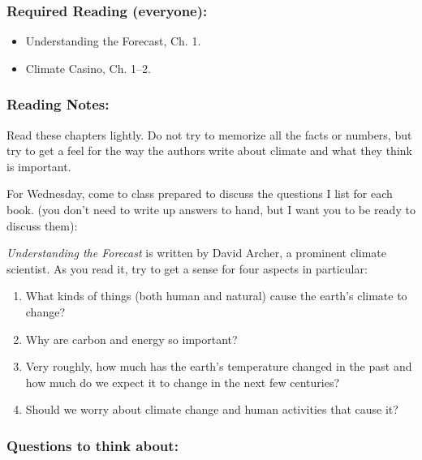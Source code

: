 \documentclass[
]{article}
\providecommand{\tightlist}{%
  \setlength{\itemsep}{0pt}\setlength{\parskip}{0pt}}
\begin{document}
\hypertarget{required-reading-everyone}{%
\subsubsection{Required Reading
(everyone):}\label{required-reading-everyone}}

\begin{itemize}
\tightlist
\item
  Understanding the Forecast, Ch. 1.
\item
  Climate Casino, Ch. 1--2.
\end{itemize}

\hypertarget{reading-notes}{%
\subsubsection{Reading Notes:}\label{reading-notes}}

Read these chapters lightly. Do not try to memorize all the facts or
numbers, but try to get a feel for the way the authors write about
climate and what they think is important.

For Wednesday, come to class prepared to discuss the questions I list
for each book. (you don't need to write up answers to hand, but I want
you to be ready to discuss them):

\emph{Understanding the Forecast} is written by David Archer, a
prominent climate scientist. As you read it, try to get a sense for four
aspects in particular:

\begin{enumerate}
\def\labelenumi{\arabic{enumi}.}
\tightlist
\item
  What kinds of things (both human and natural) cause the earth's
  climate to change?
\item
  Why are carbon and energy so important?
\item
  Very roughly, how much has the earth's temperature changed in the past
  and how much do we expect it to change in the next few centuries?
\item
  Should we worry about climate change and human activities that cause
  it?
\end{enumerate}

\hypertarget{questions-to-think-about}{%
\subsubsection{Questions to think
about:}\label{questions-to-think-about}}
\end{document}
